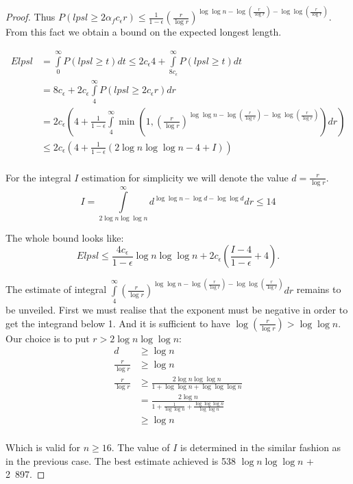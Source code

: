 \begin{proof}
Thus $P(lpsl \geq 2 \alpha_f c_\epsilon r) \leq \frac{1}{1 - \epsilon} \left(\frac{r}{\log r}\right)^{\log \log n - \log \left(\frac{r}{\log r}\right) - \log \log \left(\frac{r}{\log r}\right)}$. From this fact we obtain a bound on the expected longest length.

\begin{displaymath}
\begin{split}
E lpsl 
	& = \int\limits_0^\infty P(lpsl \geq t) dt \leq 2 c_\epsilon 4 + \int\limits_{8 c_\epsilon}^\infty P(lpsl \geq t) dt \\ 
	& = 8c_\epsilon + 2 c_\epsilon \int\limits_{4}^\infty P(lpsl \geq 2c_\epsilon r) dr \\
	& = 2c_\epsilon \left(4 + \frac{1}{1 - \epsilon} \int\limits_{4}^\infty \min\left(1, \left(\frac{r}{\log r}\right)^{\log \log n - \log \left(\frac{r}{\log r}\right) - \log \log \left(\frac{r}{\log r}\right)}\right) dr \right) \\ 
	& \leq 2c_\epsilon \left( 4 + \frac{1}{1-\epsilon}\left( 2 \log n \log \log n - 4 + I \right) \right) \\
\end{split}
\end{displaymath}

For the integral $I$ estimation for simplicity we will denote the value $d = \frac{r}{\log r}$.
\begin{displaymath}
I = \int\limits_{2 \log n \log \log n}^\infty d ^ {\log \log n - \log d - \log \log d} dr \leq 14
\end{displaymath}

The whole bound looks like:
\begin{displaymath}
E lpsl \leq \frac{4c_\epsilon}{1 - \epsilon} \log n \log \log n + 2 c_\epsilon \left( \frac{I - 4}{1 - \epsilon} + 4 \right) \textit{.}
\end{displaymath}

The estimate of integral $\int\limits_{4}^\infty \left(\frac{r}{\log r}\right)^{\log \log n - \log \left(\frac{r}{\log r}\right) - \log \log \left(\frac{r}{\log r}\right)} dr$ remains to be unveiled. First we must realise that the exponent must be negative in order to get the integrand below 1. And it is sufficient to have $\log \left( \frac{r}{\log r} \right) > \log \log n$. Our choice is to put $r > 2 \log n \log \log n$:
\begin{displaymath}
\begin{split}
d & \geq \log n \\
\frac{r}{\log r} & \geq \log n \\
\frac{r}{\log r} & \geq \frac{2 \log n \log \log n}{1 + \log \log n + \log \log \log n} \\
	& = \frac{2 \log n}{1 + \frac{1}{\log \log n} + \frac{\log \log \log n}{\log \log n}} \\
	& \geq \log n \\
\end{split}
\end{displaymath}

Which is valid for $n \geq 16$. The value of $I$ is determined in the similar fashion as in the previous case. The best estimate achieved is 538 $\log n \log \log n$ + 2~897.
\end{proof}

